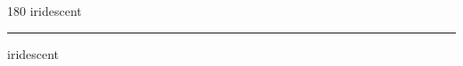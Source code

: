 
\begin{frame}
\begin{center}
\begin{turn}{180}
{\fontsize{2.5cm}{1em}\selectfont iridescent}
\end{turn}
\vspace{1em}\par  
\hrule
\vspace{1em}\par  
{\fontsize{2.5cm}{1em}\selectfont iridescent}
\end{center}
\end{frame}
